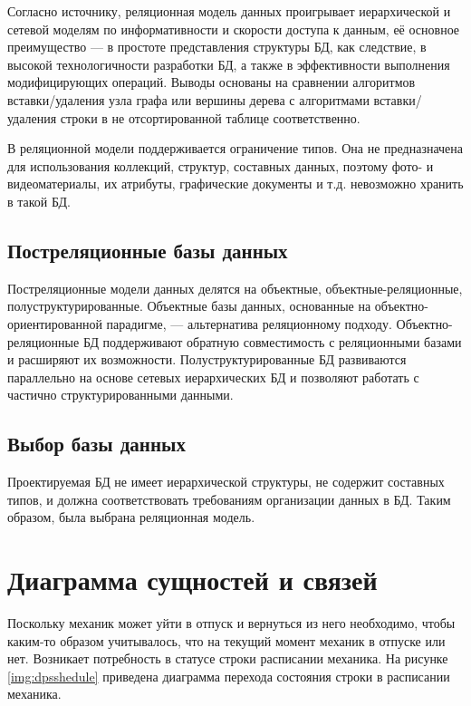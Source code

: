 Согласно источнику\cite{relat}, реляционная модель данных проигрывает иерархической и сетевой моделям по информативности и скорости доступа к данным, её основное преимущество — в простоте представления структуры БД, как следствие, в высокой технологичности разработки БД, а также в эффективности выполнения модифицирующих операций. Выводы основаны на сравнении алгоритмов вставки/удаления узла графа или вершины дерева с алгоритмами вставки/удаления строки в не отсортированной таблице соответственно.

В реляционной модели поддерживается ограничение типов\cite{postrelat}. Она не предназначена для использования коллекций, структур, составных данных, поэтому фото- и видеоматериалы, их атрибуты, графические документы и т.д. невозможно хранить в такой БД.

\subsection{Постреляционные базы данных}

Постреляционные модели данных делятся на объектные, объектные-реляционные, полуструктурированные\cite{postrelat}. Объектные базы данных, основанные на объектно-ориентированной парадигме, — альтернатива реляционному подходу\cite{postrelat}. Объектно-реляционные БД поддерживают обратную совместимость с реляционными базами и расширяют их возможности\cite{postrelat}. Полуструктурированные БД развиваются параллельно на основе сетевых иерархических БД и позволяют работать с частично структурированными данными\cite{postrelat}.

\subsection{Выбор базы данных}

Проектируемая БД не имеет иерархической структуры, не содержит составных типов, и должна соответствовать требованиям организации данных в БД. Таким образом, была выбрана реляционная модель.

\section{Диаграмма сущностей и связей}

Поскольку механик может уйти в отпуск и вернуться из него необходимо, чтобы каким-то образом учитывалось, что на текущий момент механик в отпуске или нет. 
Возникает потребность в статусе строки расписании механика.
На рисунке \ref{img:dpsshedule} приведена диаграмма перехода состояния строки в расписании механика.

